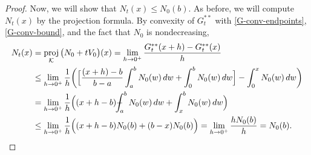 \documentclass[10pt,a4paper]{amsart}
\numberwithin{equation}{section}
\def\Xint#1{\mathchoice
{\XXint\displaystyle\textstyle{#1}}%
{\XXint\textstyle\scriptstyle{#1}}%
{\XXint\scriptstyle\scriptscriptstyle{#1}}%
{\XXint\scriptscriptstyle\scriptscriptstyle{#1}}%
   \!\int}
\def\XXint#1#2#3{{\setbox0=\hbox{$#1{#2#3}{\int}$}
\vcenter{\hbox{$#2#3$}}\kern-.5\wd0}}
\def\dashint{\Xint-}
\DeclareMathOperator{\proj}{proj}
\begin{document}
\begin{proof}
Now, we will show that $N_t(x)\leq N_0(b)$. As before, we will compute $N_t(x)$ by the projection formula. By convexity of $G_t^{**}$ with \eqref{G-conv-endpoints}, \eqref{G-conv-bound}, and the fact that $N_0$ is nondecreasing,
\begin{align*}
    N_t(x)&=\proj_{\mathcal{K}}\big(N_0+tV_0\big)(x)=\lim_{h\to0^+}\frac{G_t^{**}(x+h)-G_t^{**}(x)}{h} 
    \\
    &\leq \lim_{h\to0^+}\frac{1}{h}\bigg(\Big[\frac{(x+h)-b}{b-a}\int_a^b N_0(w) \, dw+\int_0^b N_0(w) \, dw\Big]-\int_0^x N_0(w) \, dw\bigg)
    \\
    &=\lim_{h\to0^+}\frac{1}{h}\Big((x+h-b)\dashint_a^b N_0(w) \, dw+\int_x^b N_0(w) \,dw\Big)
    \\
    &\leq \lim_{h\to0^+}\frac{1}{h}\Big((x+h-b)N_0(b)+(b-x)N_0(b)\Big)=\lim_{h\to0^+}\frac{hN_0(b)}{h}=N_0(b). \qedhere
\end{align*}

\end{proof}
\end{document}
